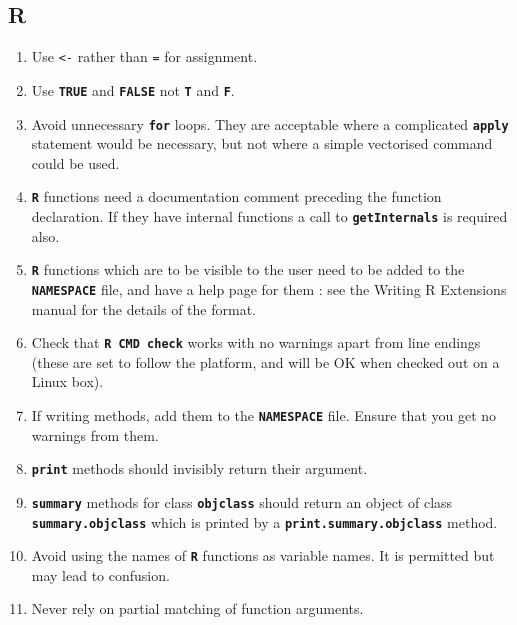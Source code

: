 \documentclass[12pt, a4paper]{article}
\renewcommand{\=}{\,=\,}
\newcommand{\+}{\,+\,}
\newcommand{\sfn}[1]{\textbf{\texttt{#1}}}
\begin{document}
\subsection{R}
\begin{enumerate}
\item Use \verb|<-| rather than \verb|=| for assignment.
\item Use \sfn{TRUE} and \sfn{FALSE} not \sfn{T} and \sfn{F}.
\item Avoid unnecessary \sfn{for} loops. They are acceptable where a complicated
  \sfn{apply} statement would be necessary, but not where a simple vectorised
    command could be used.
  \item \sfn{R} functions need a documentation comment preceding the function
    declaration. If they have internal functions a call to \sfn{getInternals} is
    required also.
  \item \sfn{R} functions which are to be visible to the user need to be added
    to the \sfn{NAMESPACE} file, and have a help page for them : see the Writing
    R Extensions manual for the details of the format.
  \item Check that \sfn{R CMD check} works with no warnings apart from line
    endings (these are set to follow the platform, and will be OK when checked
    out on a Linux box).
  \item If writing methods, add them to the \sfn{NAMESPACE} file. Ensure that
    you get no warnings from them.
  \item \sfn{print} methods should invisibly return their argument.
  \item \sfn{summary} methods for class \sfn{objclass} should return an object
    of class \sfn{summary.objclass} which is printed by a
    \sfn{print.summary.objclass} method.
\item Avoid using the names of \sfn{R} functions as variable names. It is
  permitted but may lead to confusion.
\item Never rely on partial matching of function arguments.
\end{enumerate}
\end{document}
